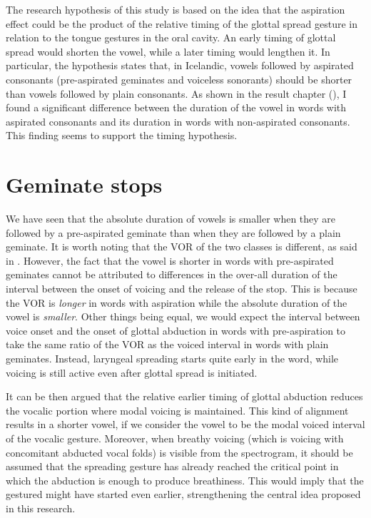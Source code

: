 \documentclass[11pt,a4paper,openany]{memoir}\usepackage[]{graphicx}\usepackage[]{color}
\begin{document}
The research hypothesis of this study is based on the idea that the aspiration effect could be the product of the relative timing of the glottal spread gesture in relation to the tongue gestures in the oral cavity.
An early timing of glottal spread would shorten the vowel, while a later timing would lengthen it.
In particular, the hypothesis states that, in Icelandic, vowels followed by aspirated consonants (pre-aspirated geminates and voiceless sonorants) should be shorter than vowels followed by plain consonants.
As shown in the result chapter (), I found a significant difference between the duration of the vowel in words with aspirated consonants and its duration in words with non-aspirated consonants.
This finding seems to support the timing hypothesis.

\section{Geminate stops}
We have seen that the absolute duration of vowels is smaller when they are followed by a pre-aspirated geminate than when they are followed by a plain geminate.
It is worth noting that the VOR of the two classes is different, as said in .
However, the fact that the vowel is shorter in words with pre-aspirated geminates cannot be attributed to differences in the over-all duration of the interval between the onset of voicing and the release of the stop.
This is because the VOR is \textit{longer} in words with aspiration while the absolute duration of the vowel is \textit{smaller}.
Other things being equal, we would expect the interval between voice onset and the onset of glottal abduction in words with pre-aspiration to take the same ratio of the VOR as the voiced interval in words with plain geminates.
Instead, laryngeal spreading starts quite early in the word, while voicing is still active even after glottal spread is initiated.

It can be then argued that the relative earlier timing of glottal abduction reduces the vocalic portion where modal voicing is maintained.
This kind of alignment results in a shorter vowel, if we consider the vowel to be the modal voiced interval of the vocalic gesture.
Moreover, when breathy voicing (which is voicing with concomitant abducted vocal folds) is visible from the spectrogram, it should be assumed that the spreading gesture has already reached the critical point in which the abduction is enough to produce breathiness.
This would imply that the gestured might have started even earlier, strengthening the central idea proposed in this research.
\end{document}

